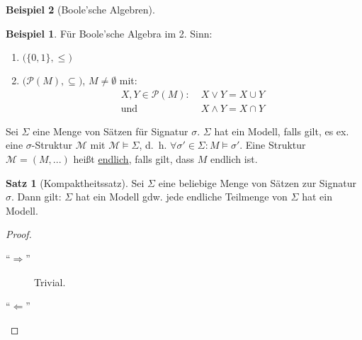 \documentclass{article}
\theoremstyle{definition}
\newtheorem{satz}[dfn]{Satz}
\newtheorem*{bsp}{Beispiel}
\theoremstyle{plain}
\newcommand{\m}[1]{\mathcal{#1}}
\begin{document}
\begin{bsp}[Boole'sche Algebren]
        \begin{bsp}
            Für Boole'sche Algebra im 2. Sinn:
            \begin{enumerate}
                \item $ \big(\{0,1\}, \leq \big) $
                \item $ \big(\m{P}(M), \subseteq) $, $ M \not = \emptyset $ mit:
                \begin{align*}
                    X ,Y \in \m{P}(M): & \; X \lor Y = X \cup Y \\
                    \text{und } & \; X \land Y = X \cap Y
                \end{align*}
            \end{enumerate}
        \end{bsp}
    \end{bsp}

    Sei $ \Sigma $ eine Menge von Sätzen für Signatur $ \sigma $.
    $ \Sigma $ hat ein Modell, falls gilt, es ex. eine $ \sigma $-Struktur $ \m{M} $ mit $ \m{M} \models \Sigma $, d.~h. $ \forall \sigma' \in \Sigma: M \models \sigma' $.
    Eine Struktur $ \m{M} = (M,...) $ heißt \underline{endlich}, falls gilt, dass $ M $ endlich ist.

    \begin{satz}[Kompaktheitssatz]
        Sei $ \Sigma $ eine beliebige Menge von Sätzen zur Signatur $ \sigma $.
        Dann gilt: $ \Sigma $ hat ein Modell gdw. jede endliche Teilmenge von $ \Sigma $ hat ein Modell.
    \end{satz}

    \begin{proof}
        ~\par
        \begin{description}
            \item[``$ \Rightarrow $''] Trivial.
            \item[``$ \Leftarrow $'']
        \end{description}
    \end{proof}
\end{document}
